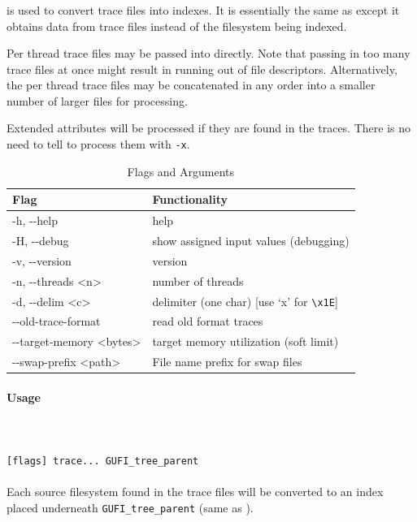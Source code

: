 \subsubsection{\gufitraceindex}
\gufitraceindex is used to convert trace files into indexes. It is
essentially the same as \gufidirindex except it obtains data from
trace files instead of the filesystem being indexed.

Per thread trace files may be passed into \gufitraceindex
directly. Note that passing in too many trace files at once might
result in running out of file descriptors. Alternatively, the per
thread trace files may be concatenated in any order into a smaller
number of larger files for processing.

Extended attributes will be processed if they are found in the traces.
There is no need to tell \gufitraceindex to process them
with \texttt{-x}.

\begin{table} [htb]
  \centering
  \begin{tabularx}{\textwidth}{|l|X|}
    \hline
    Flag & Functionality \\
    \hline
    -h, -{}-help & help \\
    \hline
    -H, -{}-debug & show assigned input values (debugging) \\
    \hline
    -v, -{}-version & version \\
    \hline
    -n, -{}-threads \textless n\textgreater & number of threads \\
    \hline
    -d, -{}-delim \textless c\textgreater & delimiter (one char)  [use `x' for \texttt{\textbackslash x1E}] \\
    \hline
    -{}-old-trace-format & read old format traces \\
    \hline
    -{}-target-memory \textless bytes\textgreater & target memory utilization (soft limit) \\
    \hline
    -{}-swap-prefix \textless path\textgreater & File name prefix for swap files \\
    \hline
  \end{tabularx}
  \caption{\gufitraceindex Flags and Arguments}
\end{table}

\paragraph{Usage} ~\\\\
\gufitraceindex \texttt{[flags] trace... GUFI\_tree\_parent} \\\\
Each source filesystem found in the trace files will be converted to an index placed underneath \texttt{GUFI\_tree\_parent} (same as \gufidirindex).
